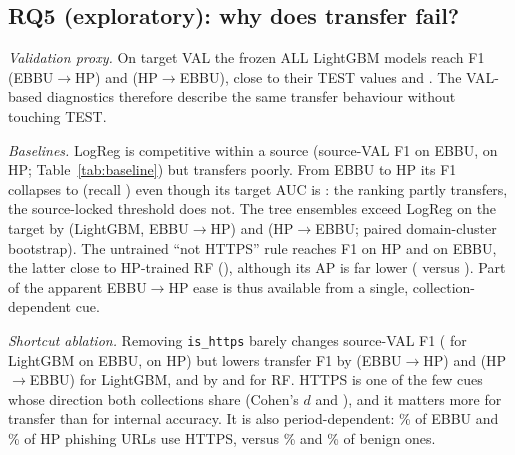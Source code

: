 \begin{table}[t]
\caption{Exploratory corrected SHAP rank agreement: source vs.\ target TEST ($\rho$, top-10 Jaccard) and across seeds for ALL; top-5 features on the source.}
\label{tab:shap}
\centering\scriptsize

\end{table}


\subsection{RQ5 (exploratory): why does transfer fail?}\label{sec:rq5}
\textit{Validation proxy.} On target VAL the frozen ALL LightGBM models reach F1  (EBBU$\rightarrow$HP) and  (HP$\rightarrow$EBBU), close to their TEST values  and . The VAL-based diagnostics therefore describe the same transfer behaviour without touching TEST.

\textit{Baselines.} LogReg is competitive within a source (source-VAL F1  on EBBU,  on HP; Table~\ref{tab:baseline}) but transfers poorly. From EBBU to HP its F1 collapses to  (recall ) even though its target AUC is : the ranking partly transfers, the source-locked threshold does not. The tree ensembles exceed LogReg on the target by   (LightGBM, EBBU$\rightarrow$HP) and   (HP$\rightarrow$EBBU; paired domain-cluster bootstrap). The untrained ``not HTTPS'' rule reaches F1  on HP and  on EBBU, the latter close to HP-trained RF (), although its AP is far lower ( versus ). Part of the apparent EBBU$\rightarrow$HP ease is thus available from a single, collection-dependent cue.

\begin{table}[t]
\caption{Exploratory baselines and no-HTTPS ablation (mean over seeds where applicable). F1$_{\mathrm{src}}$: source VAL (optimistic, sets the threshold); $\rightarrow$: target VAL at the source threshold.}
\label{tab:baseline}
\centering\scriptsize\setlength{\tabcolsep}{3pt}

\end{table}


\textit{Shortcut ablation.} Removing \texttt{is\_https} barely changes source-VAL F1 ( for LightGBM on EBBU,  on HP) but lowers transfer F1 by   (EBBU$\rightarrow$HP) and   (HP$\rightarrow$EBBU) for LightGBM, and by  and  for RF. HTTPS is one of the few cues whose direction both collections share (Cohen's $d$  and ), and it matters more for transfer than for internal accuracy. It is also period-dependent: \% of EBBU and \% of HP phishing URLs use HTTPS, versus \% and \% of benign ones.


